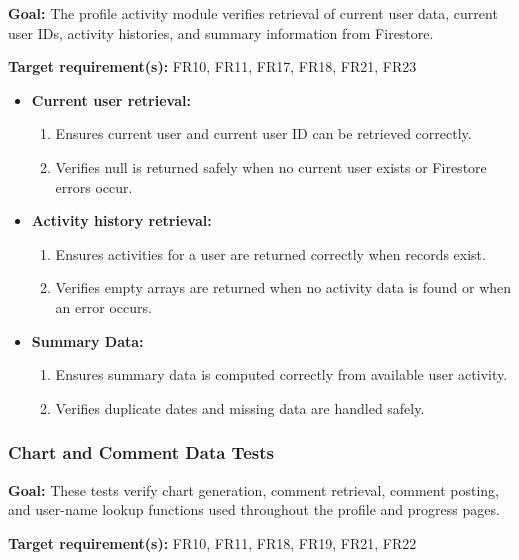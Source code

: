 \documentclass[12pt, titlepage]{article}
\begin{document}
\textbf{Goal:} The profile activity module verifies retrieval of current user data, current user IDs, activity histories, and summary information from Firestore.

\textbf{Target requirement(s):} FR10, FR11, FR17, FR18, FR21, FR23

\begin{itemize}
    \item \textbf{Current user retrieval:}
    \begin{enumerate}
        \item Ensures current user and current user ID can be retrieved correctly.
        \item Verifies null is returned safely when no current user exists or Firestore errors occur.
    \end{enumerate}

    \item \textbf{Activity history retrieval:}
    \begin{enumerate}
        \item Ensures activities for a user are returned correctly when records exist.
        \item Verifies empty arrays are returned when no activity data is found or when an error occurs.
    \end{enumerate}

    \item \textbf{Summary Data:}
    \begin{enumerate}
        \item Ensures summary data is computed correctly from available user activity.
        \item Verifies duplicate dates and missing data are handled safely.
    \end{enumerate}
\end{itemize}


\subsubsection{Chart and Comment Data Tests}

\textbf{Goal:} These tests verify chart generation, comment retrieval, comment posting, and user-name lookup functions used throughout the profile and progress pages.

\textbf{Target requirement(s):} FR10, FR11, FR18, FR19, FR21, FR22
\end{document}
